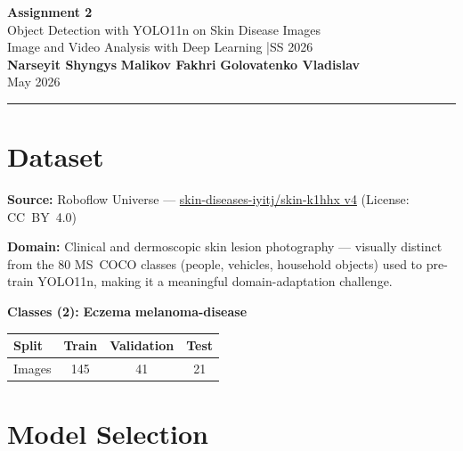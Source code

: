 \documentclass[11pt,a4paper]{article}
\begin{document}
\begin{center}
  {\LARGE\bfseries Assignment 2}\\[6pt]
  {\large Object Detection with YOLO11n on Skin Disease Images}\\[10pt]
  {\normalsize Image and Video Analysis with Deep Learning \quad|\quad SS 2026}\\[6pt]
  {\normalsize
    \textbf{Narseyit Shyngys}\quad
    \textbf{Malikov Fakhri}\quad
    \textbf{Golovatenko Vladislav}
  }\\[4pt]
  {\small May 2026}
\end{center}
\vspace{4pt}
\noindent\rule{\linewidth}{1.5pt}
\vspace{6pt}

\section{Dataset}

\textbf{Source:} Roboflow Universe ---
\href{https://universe.roboflow.com/skin-diseases-iyitj/skin-k1hhx/dataset/4}{skin-diseases-iyitj/skin-k1hhx v4}
(License: CC~BY~4.0)

\textbf{Domain:} Clinical and dermoscopic skin lesion photography --- visually distinct from the
80 MS~COCO classes (people, vehicles, household objects) used to pre-train YOLO11n, making it a
meaningful domain-adaptation challenge.

\textbf{Classes (2):} \textbf{Eczema} \quad \textbf{melanoma-disease}

\begin{center}
\begin{tabular}{lccc}
\toprule
\textbf{Split} & \textbf{Train} & \textbf{Validation} & \textbf{Test} \\
\midrule
Images & 145 & 41 & 21 \\
\bottomrule
\end{tabular}
\end{center}

\section{Model Selection}
\end{document}
